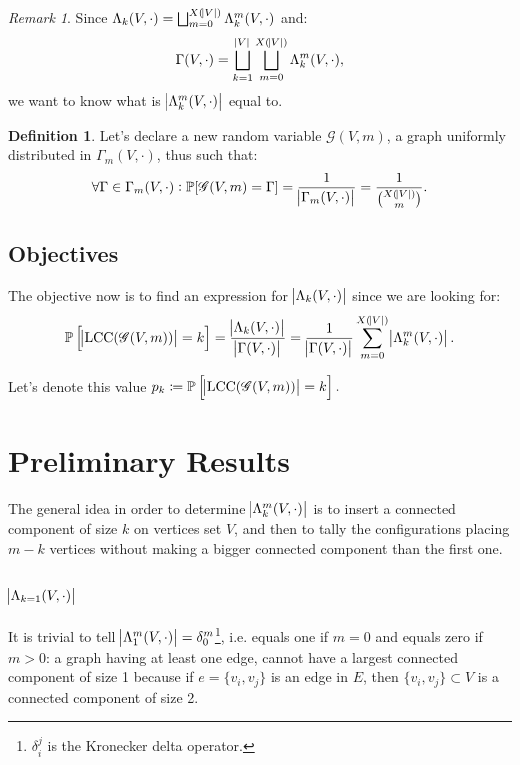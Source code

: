 \documentclass{article}
\theoremstyle{definition}
\newtheorem{definition}[lemma]{Definition}
\theoremstyle{remark}
\newtheorem*{remark}{Remark}
\DeclareMathOperator{\LCC}{LCC}
\renewcommand{\P}{\mathbb P}
\begin{document}
		\begin{remark} Since $\Lambda_k(V, \cdot) = \bigsqcup_{m=0}^{X(\abs V)}\Lambda_k^m(V, \cdot)$ and:
		\[\Gamma(V, \cdot) = \bigsqcup_{k=1}^{\abs V}\bigsqcup_{m=0}^{X(\abs V)}\Lambda_k^m(V, \cdot),\]
		we want to know what is $\abs {\Lambda_k^m(V, \cdot)}$ equal to.
		\end{remark}

		\begin{definition} Let's declare a new random variable $\mathscr G(V, m)$, a graph uniformly distributed in $\Gamma_m(V, \cdot)$, thus such that:
		\[\forall \Gamma \in \Gamma_m(V, \cdot) : \P[\mathscr G(V, m) = \Gamma] = \frac 1{\abs {\Gamma_m(V, \cdot)}} = \frac 1{\binom {X(\abs V)}m}.\]
		\end{definition}

	\subsection{Objectives}
		The objective now is to find an expression for $\abs {\Lambda_k(V, \cdot)}$ since we are looking for:
		\[\P\left[\abs {\LCC(\mathscr G(V, m))} = k\right] = \frac {\abs {\Lambda_k(V, \cdot)}}{\abs {\Gamma(V, \cdot)}}
			= \frac 1{\abs {\Gamma(V, \cdot)}}\sum_{m=0}^{X(\abs V)}\abs {\Lambda_k^m(V, \cdot)}.\]

		Let's denote this value $p_k \coloneqq \P\left[\abs {\LCC(\mathscr G(V, m))} = k\right].$

\section{Preliminary Results}\label{sec:results}
	The general idea in order to determine $\abs {\Lambda_k^m(V, \cdot)}$ is to insert a connected component of size $k$ on vertices set $V$, and then to tally the configurations
	placing $m-k$ vertices without making a bigger connected component than the first one.

	\subsection{$\abs {\Lambda_{k=1}(V, \cdot)}$}
		It is trivial to tell $\abs {\Lambda_1^m(V, \cdot)} = \delta_0^m$\footnote{$\delta_i^j$ is the Kronecker delta operator.}, i.e. equals one if $m=0$ and equals zero
		if $m>0$: a graph having at least one edge, cannot have a largest connected component of size 1 because if $e = \{v_i, v_j\}$ is an edge in $E$, then
		$\{v_i, v_j\} \subset V$ is a connected component of size 2.
\end{document}
